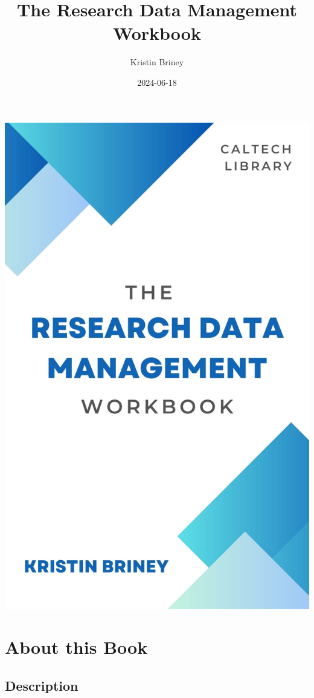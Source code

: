 \documentclass[
]{book}
\title{The Research Data Management Workbook}
\author{Kristin Briney}
\date{2024-06-18}
\begin{document}
\maketitle

\includegraphics{./images/cover.jpg}

{
\setcounter{tocdepth}{1}
\tableofcontents
}
\hypertarget{about-this-book}{%
\chapter*{About this Book}\label{about-this-book}}

\hypertarget{description}{%
\section*{Description}\label{description}}
\end{document}
